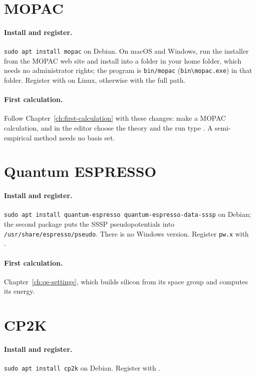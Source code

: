 \section{MOPAC}
\label{sec:run-mopac}
\paragraph{Install and register.} \texttt{sudo apt install mopac} on Debian. On macOS and Windows, run the installer from the MOPAC web site and install into a folder in your home folder, which needs no administrator rights; the program is \texttt{bin/mopac} (\texttt{bin\textbackslash mopac.exe}) in that folder. Register with  on Linux, otherwise with the full path.

\paragraph{First calculation.} Follow Chapter~\ref{ch:first-calculation} with these changes: make a MOPAC calculation, and in the editor choose the theory  and the run type . A semi-empirical method needs no basis set.

\section{Quantum ESPRESSO}
\label{sec:run-qe}
\paragraph{Install and register.} \texttt{sudo apt install quantum-espresso quantum-espresso-data-sssp} on Debian; the second package puts the SSSP pseudopotentials into \texttt{/usr/share/espresso/pseudo}. There is no Windows version. Register \texttt{pw.x} with .

\paragraph{First calculation.} Chapter~\ref{ch:qe-settings}, which builds silicon from its space group and computes its energy.

\section{CP2K}
\label{sec:run-cp2k}
\paragraph{Install and register.} \texttt{sudo apt install cp2k} on Debian. Register with .

